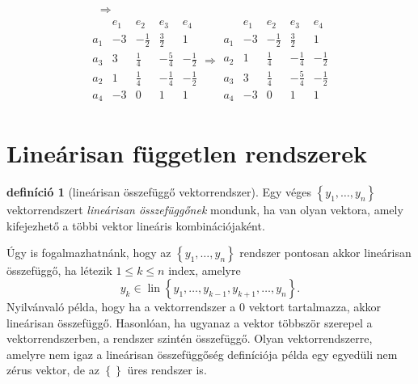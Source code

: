 \documentclass[9pt, a4paper, showtrims]{memoir}
\theoremstyle{plain}
\theoremstyle{remark}
\theoremstyle{definition}
\newtheorem{definition}[proposition]{definíció}
\DeclareMathOperator{\lin}{lin}
\begin{document}
\begin{multline*}
\begin{array}{r|c|cccc}
    \end{array}\Rightarrow
    \\
    \begin{array}{r|cccc}
        &e_1&e_2&e_3&e_4\\
        \hline
        a_1 & -3&-\frac{1}{2}&\frac{3}{2}&1\\
        a_3 & 3&\frac{1}{4}&-\frac{5}{4}&-\frac{1}{2}\\
        a_2 & 1&\frac{1}{4}&-\frac{1}{4}&-\frac{1}{2}\\
        a_4 & -3&0&1&1
    \end{array}\Rightarrow
    \begin{array}{r|cccc}
        &e_1&e_2&e_3&e_4\\
        \hline
        a_1 & -3&-\frac{1}{2}&\frac{3}{2}&1\\
        a_2 & 1&\frac{1}{4}&-\frac{1}{4}&-\frac{1}{2}\\
        a_3 & 3&\frac{1}{4}&-\frac{5}{4}&-\frac{1}{2}\\
        a_4 & -3&0&1&1
    \end{array}
\end{multline*}

\section{Lineárisan független rendszerek}
\begin{definition}[lineárisan összefüggő vektorrendszer]
    Egy véges $\left\{ y_1,\dots,y_n \right\}$ vektorrendszert \emph{lineárisan összefüggőnek}
    mondunk, ha van olyan vektora, amely kifejezhető a többi vektor lineáris kombinációjaként.
\end{definition}
Úgy is fogalmazhatnánk, hogy az $\left\{ y_1,\dots,y_n \right\}$ rendszer pontosan akkor
lineárisan összefüggő, ha létezik $1\leq k\leq n$ index, amelyre
\[
    y_k\in\lin\left\{ y_1,\dots,y_{k-1},y_{k+1},\dots,y_n \right\}.
\]
Nyilvánvaló példa, hogy ha a vektorrendszer a $0$ vektort tartalmazza, 
akkor lineárisan összefüggő. 
Hasonlóan, ha ugyanaz a vektor többször szerepel a vektorrendszerben, a rendszer szintén összefüggő.
Olyan vektorrendszerre, amelyre nem igaz a lineárisan összefüggőség definíciója példa egy egyedüli nem zérus vektor,
de az $\left\{  \right\}$ üres rendszer is.
\end{document}
